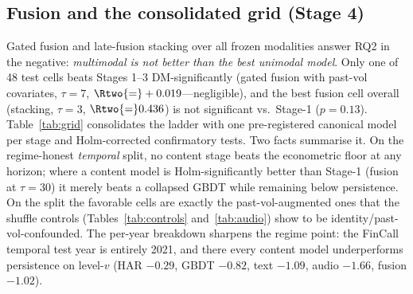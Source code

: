 

\subsection{Fusion and the consolidated grid (Stage 4)}
Gated fusion and late-fusion stacking over all frozen modalities answer RQ2 in the
negative: \emph{multimodal is not better than the best unimodal model}. Only one of
48 \dv{} test cells beats Stages 1--3 DM-significantly (gated fusion with
past-vol covariates, \tickerdisjoint{} $\tau{=}7$, $\Rtwo{=}+0.019$---negligible), and the best fusion cell overall
(stacking, \tickerdisjoint{} $\tau{=}3$, $\Rtwo{=}0.436$) is not significant
vs.\ Stage-1 ($p{=}0.13$). Table~\ref{tab:grid} consolidates the ladder with one
pre-registered canonical model per stage and Holm-corrected confirmatory tests. Two
facts summarise it. On the regime-honest \emph{temporal} split, no content stage
beats the econometric floor at any horizon; where a content model is
Holm-significantly better than Stage-1 (fusion at $\tau{=}30$) it merely beats a
collapsed GBDT while remaining below persistence. On the \emph{\tickerdisjoint}
split the favorable cells are exactly the past-vol-augmented ones that the shuffle
controls (Tables~\ref{tab:controls} and~\ref{tab:audio}) show to be
identity/past-vol-confounded. The per-year breakdown sharpens the regime point: the
FinCall temporal test year is entirely 2021, and there every content model
underperforms persistence on level-$v$ (HAR $-0.29$, GBDT $-0.82$, text $-1.09$,
audio $-1.66$, fusion $-1.02$).



